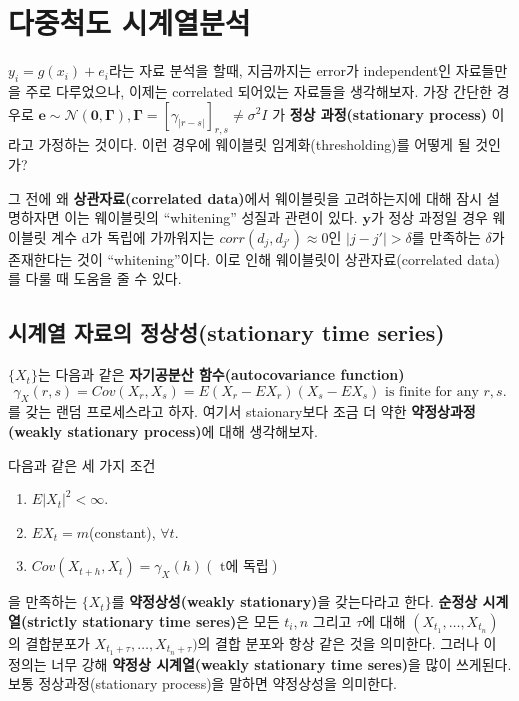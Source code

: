 \documentclass[b5paper,]{scrbook}
\theoremstyle{plain}
\theoremstyle{definition}
\numberwithin{equation}{section}
\let\BeginKnitrBlock\begin \let\EndKnitrBlock\end
\begin{document}
\hypertarget{multiscalets}{%
\chapter{다중척도 시계열분석}\label{multiscalets}}

\(y_{i}=g(x_{i})+e_{i}\)라는 자료 분석을 할때, 지금까지는 error가 independent인 자료들만을 주로 다루었으나, 이제는 correlated 되어있는 자료들을 생각해보자. 가장 간단한 경우로 \(\mathbf{e} \sim \mathcal{N}(\mathbf{0},\boldsymbol{\Gamma}), \boldsymbol{\Gamma}=[ \gamma_{|r-s|}]_{r,s} \neq \sigma^{2}I\) 가 \textbf{정상 과정(stationary process)} 이라고 가정하는 것이다. 이런 경우에 웨이블릿 임계화(thresholding)를 어떻게 될 것인가?

그 전에 왜 \textbf{상관자료(correlated data)}에서 웨이블릿을 고려하는지에 대해 잠시 설명하자면 이는 웨이블릿의 ``whitening'' 성질과 관련이 있다. \(\mathbf{y}\)가 정상 과정일 경우 웨이블릿 계수 d가 독립에 가까워지는 \(corr(d_{j},d_{j'})\approx 0\)인 \(|j-j'|>\delta\)를 만족하는 \(\delta\)가 존재한다는 것이 ``whitening''이다. 이로 인해 웨이블릿이 상관자료(correlated data)를 다룰 때 도움을 줄 수 있다.

\hypertarget{--stationary-time-series}{%
\section{시계열 자료의 정상성(stationary time series)}\label{--stationary-time-series}}

\(\{ X_{t} \}\)는 다음과 같은 \textbf{자기공분산 함수(autocovariance function)}
\[\gamma_{X}(r,s)=Cov(X_{r},X_{s})=E(X_{r}-EX_{r})(X_{s}-EX_{s}) \text{ is finite for any } r,s.\]
를 갖는 랜덤 프로세스라고 하자. 여기서 staionary보다 조금 더 약한 \textbf{약정상과정(weakly stationary process)}에 대해 생각해보자.

\BeginKnitrBlock{definition}
\protect\hypertarget{def:unnamed-chunk-319}{}{\label{def:unnamed-chunk-319} }다음과 같은 세 가지 조건

\begin{enumerate}
\def\labelenumi{\arabic{enumi}.}
\item
  \(E|X_{t}|^{2} < \infty\).
\item
  \(EX_{t}=m\)(constant), \(\forall t\).
\item
  \(Cov(X_{t+h},X_{t})=\gamma_{X}(h) (\text{ t에 독립})\)
\end{enumerate}

을 만족하는 \(\{ X_{t} \}\)를 \textbf{약정상성(weakly stationary)}을 갖는다라고 한다. \textbf{순정상 시계열(strictly stationary time seres)}은 모든 \(t_{i}, n\) 그리고 \(\tau\)에 대해 \((X_{t_{1}}, \ldots, X_{t_{n}})\)의 결합분포가 \(X_{t_{1}+\tau}, \ldots, X_{t_{n}+\tau})\)의 결합 분포와 항상 같은 것을 의미한다. 그러나 이 정의는 너무 강해 \textbf{약정상 시계열(weakly stationary time seres)}을 많이 쓰게된다. 보통 정상과정(stationary process)을 말하면 약정상성을 의미한다.
\EndKnitrBlock{definition}
\end{document}
